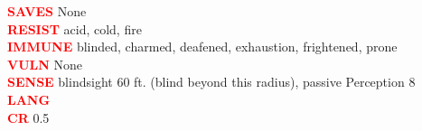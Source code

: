 \documentclass{article}
\begin{document}
\begin{adjustbox}{minipage=0.45\textwidth, margin=\fboxsep, bgimage=../images/texture2.pdf}
{\begin{minipage}[t][10.5in][t]{0.9\textwidth}
\begin{flushleft}
            \textcolor{red}{\textbf{SAVES}} None \\
            \textcolor{red}{\textbf{RESIST}} acid, cold, fire\\
            \textcolor{red}{\textbf{IMMUNE}} blinded, charmed, deafened, exhaustion, frightened, prone\\
            \textcolor{red}{\textbf{VULN}} None\\      
            \textcolor{red}{\textbf{SENSE}} blindsight 60 ft. (blind beyond this radius), passive Perception 8\\
            \textcolor{red}{\textbf{LANG}} \\
            \textcolor{red}{\textbf{CR}}  0.5\\
        \end{flushleft}
        \end{minipage}
    }
\end{adjustbox}       


\pagebreak
\end{document}
